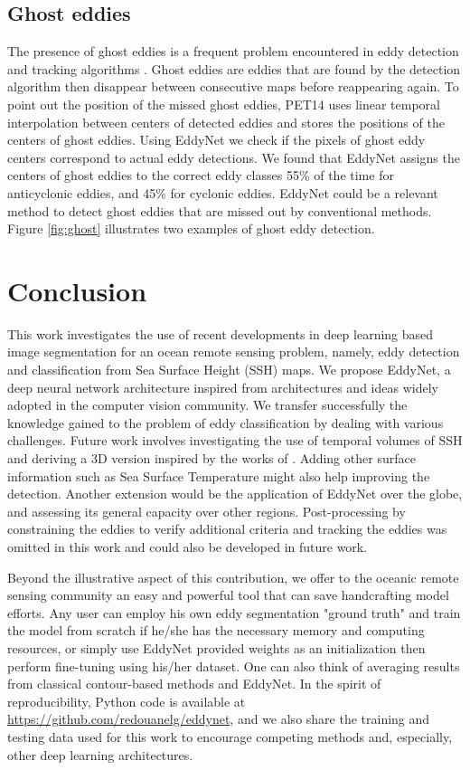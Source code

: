 \documentclass[journal]{IEEEtran}
\begin{document}
\subsection{Ghost eddies}
The presence of ghost eddies is a frequent problem encountered in eddy detection and tracking algorithms \cite{faghmous2015daily}. Ghost eddies are eddies that are found by the detection algorithm then disappear between consecutive maps before reappearing again. To point out the position of the missed ghost eddies, PET14 uses linear temporal interpolation between centers of detected eddies and stores the positions of the centers of ghost eddies. Using EddyNet we check if the pixels of ghost eddy centers correspond to actual eddy detections. We found that EddyNet assigns the centers of ghost eddies to the correct eddy classes 55\% of the time for anticyclonic eddies, and 45\% for cyclonic eddies. EddyNet could be a relevant method to detect ghost eddies that are missed out by conventional methods. Figure \ref{fig:ghost} illustrates two examples of ghost eddy detection. 

\section{Conclusion}
This work investigates the use of recent developments in deep learning based image segmentation for an ocean remote sensing problem, namely, eddy detection and classification from Sea Surface Height (SSH) maps. We propose EddyNet, a deep neural network architecture inspired from architectures and ideas widely adopted in the computer vision community. We transfer successfully the knowledge gained to the problem of eddy classification by dealing with various challenges. Future work involves investigating the use of temporal volumes of SSH and deriving a 3D version inspired by the works of \cite{milletari2016v}. Adding other surface information such as Sea Surface Temperature might also help improving the detection. Another extension would be the application of EddyNet over the globe, and assessing its general capacity over other regions. Post-processing by constraining the eddies to verify additional criteria and tracking the eddies was omitted in this work and could also be developed in future work.  

Beyond the illustrative aspect of this contribution, we offer to the oceanic remote sensing community an easy and powerful tool that can save handcrafting model efforts. Any user can employ his own eddy segmentation "ground truth" and train the model from scratch if he/she has the necessary memory and computing resources, or simply use EddyNet provided weights as an initialization then perform fine-tuning using his/her dataset. One can also think of averaging results from classical contour-based methods and EddyNet. In the spirit of reproducibility, Python code is available at \url{https://github.com/redouanelg/eddynet}, and we also share the training and testing data used for this work to encourage competing methods and, especially, other deep learning architectures.
\end{document}
